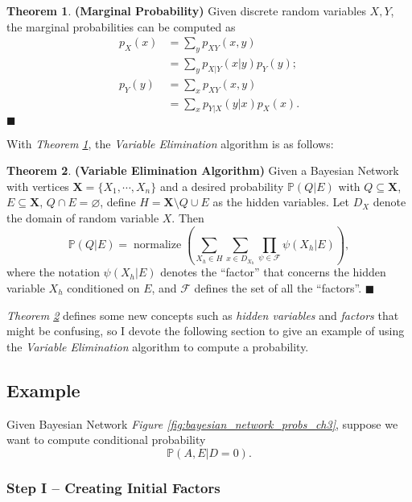 \documentclass{article}
\theoremstyle{definition}
\newtheorem{theorem}{Theorem}
\newenvironment{theoremqed}
    {\begin{theorem}}
    {\hfill \qedsymbol \end{theorem}}
\renewcommand{\qedsymbol}{\(\blacksquare\)}
\newcommand{\X}{\mathbf{X}}
\renewcommand{\P}{\mathbb{P}}
\begin{document}
\begin{theoremqed} \label{thm:marginal}
    \textbf{(Marginal Probability)} Given discrete random variables \(X, Y\), the marginal probabilities can be computed as
    \begin{align*}
        p_X(x) &= \sum_y p_{XY}(x, y) \\
        &= \sum_y p_{X|Y}(x|y) p_Y(y); \\
        p_Y(y) &= \sum_x p_{XY}(x, y) \\
        &= \sum_x p_{Y|X}(y|x) p_X(x).
    \end{align*}
\end{theoremqed}

With \textit{Theorem \ref{thm:marginal}}, the \textit{Variable Elimination} algorithm is as follows:

\begin{theoremqed} \label{thm:vea}
    \textbf{(Variable Elimination Algorithm)} Given a Bayesian Network with vertices \(\X = \{X_1, \cdots, X_n\}\) and a desired probability \(\P(Q | E)\) with \(Q \subseteq \X\), \(E \subseteq \X\), \(Q \cap E = \varnothing\), define \(H = \X \setminus Q \cup E\) as the hidden variables. Let \(D_X\) denote the domain of random variable \(X\). Then
    \[\P(Q | E) = \operatorname{normalize}\left(\sum_{X_h \in H} \sum_{x\in D_{X_h}} \prod_{\psi \in \mathcal{F}} \psi(X_h|E) \right),\]
    where the notation \(\psi(X_h|E)\) denotes the ``factor'' that concerns the hidden variable \(X_h\) conditioned on \(E\), and \(\mathcal{F}\) defines the set of all the ``factors''.
\end{theoremqed}

\textit{Theorem \ref{thm:vea}} defines some new concepts such as \textit{hidden variables} and \textit{factors} that might be confusing, so I devote the following section to give an example of using the \textit{Variable Elimination} algorithm to compute a probability.

\subsection{Example}

Given Bayesian Network \textit{Figure \ref{fig:bayesian_network_probs_ch3}}, suppose we want to compute conditional probability
\[\P(A, E | D = 0).\]

\subsubsection{Step I -- Creating Initial Factors}
\end{document}
